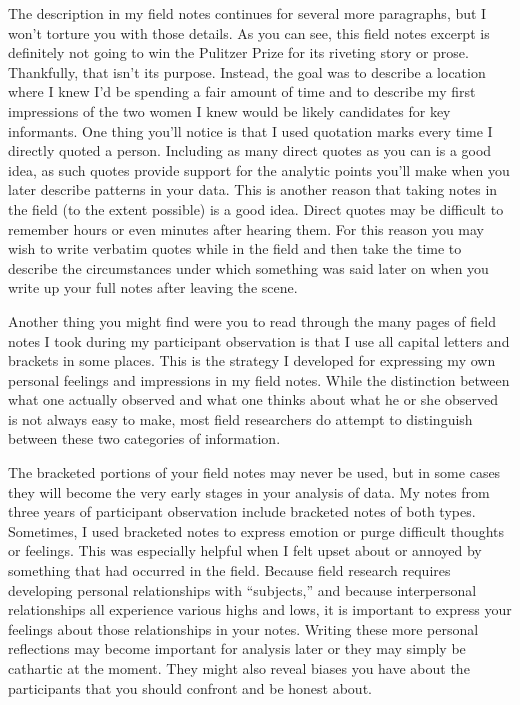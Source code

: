 The description in my field notes continues for several more paragraphs, but I won’t torture you with those details. As you can see, this field notes excerpt is definitely not going to win the Pulitzer Prize for its riveting story or prose. Thankfully, that isn’t its purpose. Instead, the goal was to describe a location where I knew I’d be spending a fair amount of time and to describe my first impressions of the two women I knew would be likely candidates for key informants. One thing you’ll notice is that I used quotation marks every time I directly quoted a person. Including as many direct quotes as you can is a good idea, as such quotes provide support for the analytic points you’ll make when you later describe patterns in your data. This is another reason that taking notes in the field (to the extent possible) is a good idea. Direct quotes may be difficult to remember hours or even minutes after hearing them. For this reason you may wish to write verbatim quotes while in the field and then take the time to describe the circumstances under which something was said later on when you write up your full notes after leaving the scene.

Another thing you might find were you to read through the many pages of field notes I took during my participant observation is that I use all capital letters and brackets in some places. This is the strategy I developed for expressing my own personal feelings and impressions in my field notes. While the distinction between what one actually observed and what one thinks about what he or she observed is not always easy to make, most field researchers do attempt to distinguish between these two categories of information.

The bracketed portions of your field notes may never be used, but in some cases they will become the very early stages in your analysis of data. My notes from three years of participant observation include bracketed notes of both types. Sometimes, I used bracketed notes to express emotion or purge difficult thoughts or feelings. This was especially helpful when I felt upset about or annoyed by something that had occurred in the field. Because field research requires developing personal relationships with ``subjects,'' and because interpersonal relationships all experience various highs and lows, it is important to express your feelings about those relationships in your notes. Writing these more personal reflections may become important for analysis later or they may simply be cathartic at the moment. They might also reveal biases you have about the participants that you should confront and be honest about.


